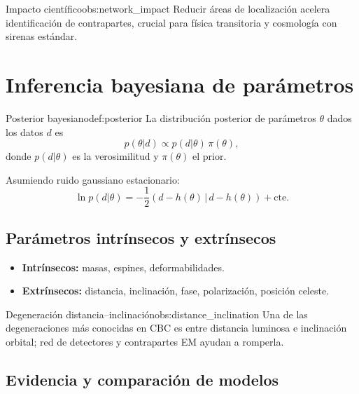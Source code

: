 \begin{observacion}{Impacto científico}{obs:network_impact}
Reducir áreas de localización acelera identificación de contrapartes, crucial para física transitoria y cosmología con sirenas estándar.
\end{observacion}

\section{Inferencia bayesiana de parámetros}
\label{sec:bayes_inference}

\begin{definicion}{Posterior bayesiano}{def:posterior}
La distribución posterior de parámetros $\theta$ dados los datos $d$ es
\begin{equation}
p(\theta|d)\propto p(d|\theta)\,\pi(\theta),
\end{equation}
donde $p(d|\theta)$ es la verosimilitud y $\pi(\theta)$ el prior.
\end{definicion}

Asumiendo ruido gaussiano estacionario:
\begin{equation}
\ln p(d|\theta)=
-\frac{1}{2}(d-h(\theta)\,|\,d-h(\theta))+\text{cte}.
\end{equation}

\subsection{Parámetros intrínsecos y extrínsecos}

\begin{itemize}[leftmargin=2em]
  \item \textbf{Intrínsecos:} masas, espines, deformabilidades.
  \item \textbf{Extrínsecos:} distancia, inclinación, fase, polarización, posición celeste.
\end{itemize}

\begin{observacion}{Degeneración distancia--inclinación}{obs:distance_inclination}
Una de las degeneraciones más conocidas en CBC es entre distancia luminosa e inclinación orbital; red de detectores y contrapartes EM ayudan a romperla.
\end{observacion}

\subsection{Evidencia y comparación de modelos}


